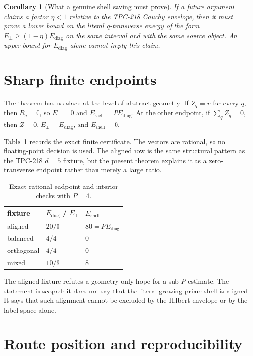 \documentclass[11pt]{article}
\newtheorem{corollary}[theorem]{Corollary}
\newcommand{\Ediag}{E_{\mathrm{diag}}}
\newcommand{\Eperp}{E_{\perp}}
\newcommand{\Eshell}{E_{\mathrm{shell}}}
\newcommand{\Zbar}{\overline Z}
\begin{document}
\begin{corollary}[What a genuine shell saving must prove]
If a future argument claims a factor $\eta<1$ relative to the TPC-218 Cauchy envelope,
then it must prove a lower bound on the literal q-transverse energy of the form
$\Eperp\geq(1-\eta)\Ediag$ on the same interval and with the same source object.
An upper bound for $\Ediag$ alone cannot imply this claim.
\end{corollary}

\section{Sharp finite endpoints}

The theorem has no slack at the level of abstract geometry.  If $Z_q=v$ for every
$q$, then $R_q=0$, so $\Eperp=0$ and $\Eshell=P\Ediag$.  At the other endpoint, if
$\sum_qZ_q=0$, then $\Zbar=0$, $\Eperp=\Ediag$, and $\Eshell=0$.

Table~\ref{tab:firewall} records the exact finite certificate.  The vectors are rational,
so no floating-point decision is used.  The aligned row is the same structural pattern
as the TPC-218 $d=5$ fixture, but the present theorem explains it as a zero-transverse
endpoint rather than merely a large ratio.

\begin{table}[t]
\centering
\begin{tabular}{lll}
\toprule
fixture & $\Ediag$ / $\Eperp$ & $\Eshell$\\
\midrule
aligned & $20/0$ & $80=P\Ediag$\\
balanced & $4/4$ & $0$\\
orthogonal & $4/4$ & $0$\\
mixed & $10/8$ & $8$\\
\bottomrule
\end{tabular}
\caption{Exact rational endpoint and interior checks with $P=4$.}
\label{tab:firewall}
\end{table}

The aligned fixture refutes a geometry-only hope for a sub-$P$ estimate.  The statement
is scoped: it does not say that the literal growing prime shell is aligned.  It says that
such alignment cannot be excluded by the Hilbert envelope or by the label space alone.

\section{Route position and reproducibility}
\end{document}
